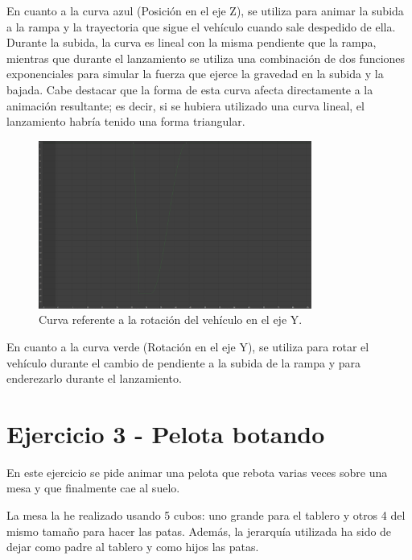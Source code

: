 \documentclass{article}
\begin{document}
\bigskip

En cuanto a la curva azul (Posición en el eje Z), se utiliza para animar la subida a la rampa y la trayectoria que sigue el vehículo cuando sale despedido de ella. Durante la subida, la curva es lineal con la misma pendiente que la rampa, mientras que durante el lanzamiento se utiliza una combinación de dos funciones exponenciales para simular la fuerza que ejerce la gravedad en la subida y la bajada. Cabe destacar que la forma de esta curva afecta directamente a la animación resultante; es decir, si se hubiera utilizado una curva lineal, el lanzamiento habría tenido una forma triangular.

\begin{figure}[H]
    \centering
    \includegraphics[width=0.8\textwidth]{imagenes/Ejercicio2/curvas/green.png}
    \caption{Curva referente a la rotación del vehículo en el eje Y.}
\end{figure}

\bigskip

En cuanto a la curva verde (Rotación en el eje Y), se utiliza para rotar el vehículo durante el cambio de pendiente a la subida de la rampa y para enderezarlo durante el lanzamiento.


\section{Ejercicio 3 - Pelota botando}

En este ejercicio se pide animar una pelota que rebota varias veces sobre una mesa y que finalmente cae al suelo.

\bigskip

La mesa la he realizado usando 5 cubos: uno grande para el tablero y otros 4 del mismo tamaño para hacer las patas. Además, la jerarquía utilizada ha sido de dejar como padre al tablero y como hijos las patas.
\end{document}
